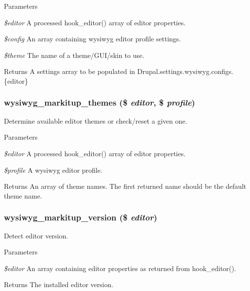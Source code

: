 \begin{DoxyParams}{Parameters}
\item[{\em \$editor}]A processed hook\_\-editor() array of editor properties. \item[{\em \$config}]An array containing wysiwyg editor profile settings. \item[{\em \$theme}]The name of a theme/GUI/skin to use.\end{DoxyParams}
\begin{DoxyReturn}{Returns}
A settings array to be populated in Drupal.settings.wysiwyg.configs.\{editor\} 
\end{DoxyReturn}
\hypertarget{markitup_8inc_af28d3628d3dfa4d5014ffcda5226a847}{
\subsubsection[{wysiwyg\_\-markitup\_\-themes}]{\setlength{\rightskip}{0pt plus 5cm}wysiwyg\_\-markitup\_\-themes (\$ {\em editor}, \/  \$ {\em profile})}}
\label{markitup_8inc_af28d3628d3dfa4d5014ffcda5226a847}
Determine available editor themes or check/reset a given one.


\begin{DoxyParams}{Parameters}
\item[{\em \$editor}]A processed hook\_\-editor() array of editor properties. \item[{\em \$profile}]A wysiwyg editor profile.\end{DoxyParams}
\begin{DoxyReturn}{Returns}
An array of theme names. The first returned name should be the default theme name. 
\end{DoxyReturn}
\hypertarget{markitup_8inc_ac697a2d7f7865c6b3dac074e92028311}{
\subsubsection[{wysiwyg\_\-markitup\_\-version}]{\setlength{\rightskip}{0pt plus 5cm}wysiwyg\_\-markitup\_\-version (\$ {\em editor})}}
\label{markitup_8inc_ac697a2d7f7865c6b3dac074e92028311}
Detect editor version.


\begin{DoxyParams}{Parameters}
\item[{\em \$editor}]An array containing editor properties as returned from hook\_\-editor().\end{DoxyParams}
\begin{DoxyReturn}{Returns}
The installed editor version. 
\end{DoxyReturn}
